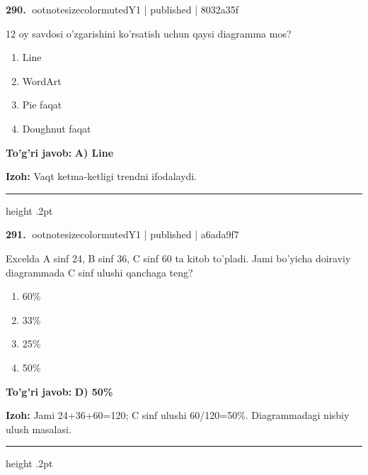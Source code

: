 \documentclass[10pt,a4paper]{article}
\begin{document}
\textbf{\color{ink}290.} {ootnotesizecolor{muted}Y1 | published | 8032a35f}
\par
12 oy savdosi o'zgarishini ko'rsatish uchun qaysi diagramma mos?
\begin{enumerate}[label=\Alph*),leftmargin=9mm]
\item Line
\item WordArt
\item Pie faqat
\item Doughnut faqat
\end{enumerate}
\begin{tcolorbox}[enhanced,breakable,colback=teal!4,colframe=teal!55!black,boxrule=0.45pt,arc=1.2mm,left=2.8mm,right=2.8mm,top=2mm,bottom=2mm]
\textbf{\color{teal}To'g'ri javob:} \textbf{A) Line}
\par\smallskip
\textbf{Izoh:} Vaqt ketma-ketligi trendni ifodalaydi.
\end{tcolorbox}
\vspace{2mm}\hrule height .2pt\vspace{2mm}

\textbf{\color{ink}291.} {ootnotesizecolor{muted}Y1 | published | a6ada9f7}
\par
Excelda A sinf 24, B sinf 36, C sinf 60 ta kitob to'pladi. Jami bo'yicha doiraviy diagrammada C sinf ulushi qanchaga teng?
\begin{enumerate}[label=\Alph*),leftmargin=9mm]
\item 60\%
\item 33\%
\item 25\%
\item 50\%
\end{enumerate}
\begin{tcolorbox}[enhanced,breakable,colback=teal!4,colframe=teal!55!black,boxrule=0.45pt,arc=1.2mm,left=2.8mm,right=2.8mm,top=2mm,bottom=2mm]
\textbf{\color{teal}To'g'ri javob:} \textbf{D) 50\%}
\par\smallskip
\textbf{Izoh:} Jami 24+36+60=120; C sinf ulushi 60/120=50\%. Diagrammadagi nisbiy ulush masalasi.
\end{tcolorbox}
\vspace{2mm}\hrule height .2pt\vspace{2mm}
\end{document}
